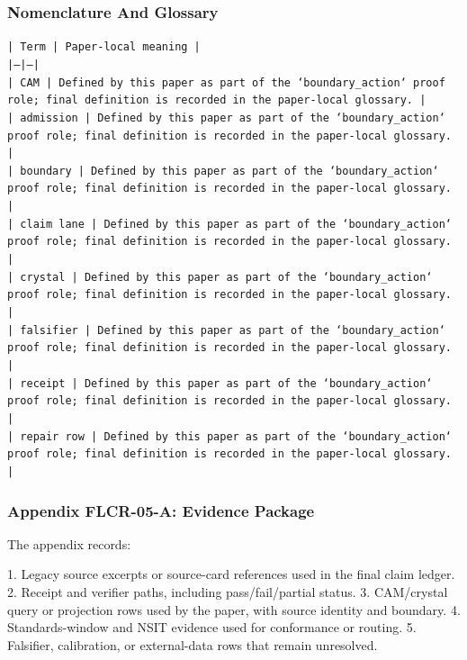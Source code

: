 \documentclass[11pt]{article}
\begin{document}
\subsubsection*{Nomenclature And Glossary}

\noindent\texttt{| Term | Paper-local meaning |}\\
\noindent\texttt{|---|---|}\\
\noindent\texttt{| CAM | Defined by this paper as part of the `boundary\_action` proof role; final definition is recorded in the paper-local glossary. |}\\
\noindent\texttt{| admission | Defined by this paper as part of the `boundary\_action` proof role; final definition is recorded in the paper-local glossary. |}\\
\noindent\texttt{| boundary | Defined by this paper as part of the `boundary\_action` proof role; final definition is recorded in the paper-local glossary. |}\\
\noindent\texttt{| claim lane | Defined by this paper as part of the `boundary\_action` proof role; final definition is recorded in the paper-local glossary. |}\\
\noindent\texttt{| crystal | Defined by this paper as part of the `boundary\_action` proof role; final definition is recorded in the paper-local glossary. |}\\
\noindent\texttt{| falsifier | Defined by this paper as part of the `boundary\_action` proof role; final definition is recorded in the paper-local glossary. |}\\
\noindent\texttt{| receipt | Defined by this paper as part of the `boundary\_action` proof role; final definition is recorded in the paper-local glossary. |}\\
\noindent\texttt{| repair row | Defined by this paper as part of the `boundary\_action` proof role; final definition is recorded in the paper-local glossary. |}\\

\subsubsection*{Appendix FLCR-05-A: Evidence Package}

The appendix records:

1. Legacy source excerpts or source-card references used in the final claim ledger.
2. Receipt and verifier paths, including pass/fail/partial status.
3. CAM/crystal query or projection rows used by the paper, with source identity and boundary.
4. Standards-window and NSIT evidence used for conformance or routing.
5. Falsifier, calibration, or external-data rows that remain unresolved.
\end{document}
